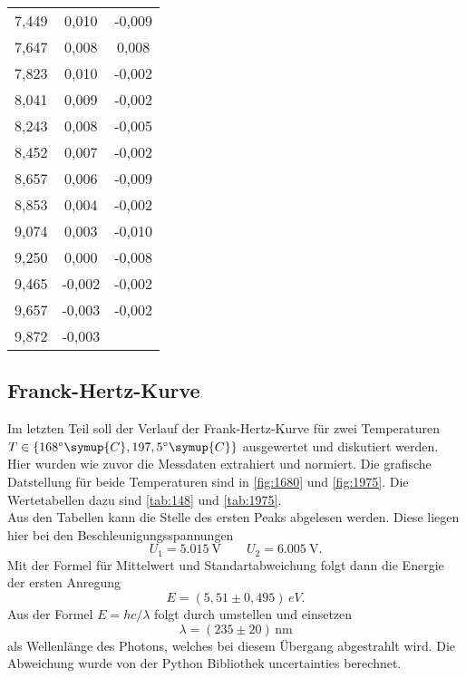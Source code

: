\begin{longtable}{c c c}
	7,449&0,010&-0,009 \\
	7,647&0,008&0,008 \\
	7,823&0,010&-0,002 \\
	8,041&0,009&-0,002 \\
	8,243&0,008&-0,005 \\
	8,452&0,007&-0,002 \\
	8,657&0,006&-0,009 \\
	8,853&0,004&-0,002 \\
	9,074&0,003&-0,010 \\
	9,250&0,000&-0,008 \\
	9,465&-0,002&-0,002 \\
	9,657&-0,003&-0,002 \\
	9,872&-0,003& \\
\end{longtable}

\subsection{Franck-Hertz-Kurve}
\label{sec:Franck-Hertz-Kurve}
Im letzten Teil soll der Verlauf der Frank-Hertz-Kurve für zwei Temperaturen 
$T \in \{168^\circ \symup{C}, 197,5^\circ \symup{C}\}$ ausgewertet und diskutiert werden.
Hier wurden wie zuvor die Messdaten extrahiert und normiert. Die grafische Datstellung für
beide Temperaturen sind in \autoref{fig:1680} und \autoref{fig:1975}. Die Wertetabellen
dazu sind \autoref{tab:148} und \autoref{tab:1975}.
\\
Aus den Tabellen kann die Stelle des ersten Peaks abgelesen werden. Diese liegen hier bei
den Beschleunigungsspannungen
\begin{equation}
	U_1 = \SI{5.015}{\volt}
	\qquad
	U_2 = \SI{6.005}{\volt}.
\end{equation}
Mit der Formel für Mittelwert und Standartabweichung folgt dann die Energie der ersten
Anregung
\begin{equation}
	E = (5,51 \pm 0,495) \, \si{eV}.
\end{equation}
Aus der Formel $E = hc/\lambda$ folgt durch umstellen und einsetzen
\begin{equation}
	\lambda = (235 \pm 20) \, \si{\nano\meter}
\end{equation}
als Wellenlänge des Photons, welches bei diesem Übergang abgestrahlt wird. Die Abweichung
wurde von der Python Bibliothek uncertainties berechnet.

